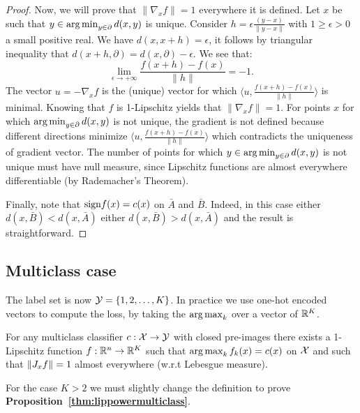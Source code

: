\begin{proof}
        Now, we will prove that $\|\nabla_xf\|=1$ everywhere it is defined. Let $x$ be such that $y\in\operatorname*{arg\,min}_{y\in\partial}{d(x,y)}$ is unique. Consider $h=\epsilon\frac{(y-x)}{\|y-x\|}$ with $1\geq\epsilon>0$ a small positive real. We have $d(x,x+h)=\epsilon$, it follows by triangular inequality that $d(x+h,\partial)=d(x,\partial)-\epsilon$.   
        We see that:
        $$\lim_{\epsilon\to+\infty}\frac{f(x+h)-f(x)}{\|h\|}=-1.$$
        The vector $u=-\nabla_xf$ is the (unique) vector for which $\langle u,\frac{f(x+h)-f(x)}{\|h\|}\rangle$ is minimal. Knowing that $f$ is \mbox{1-Lipschitz} yields that $\|\nabla_xf\|=1$. For points $x$ for which $\operatorname*{arg\,min}_{y\in\partial}{d(x,y)}$ is not unique, the gradient is not defined because different directions minimize $\langle u,\frac{f(x+h)-f(x)}{\|h\|}\rangle$ which contradicts the uniqueness of gradient vector. The number of points for which $y\in\operatorname*{arg\,min}_{y\in\partial}{d(x,y)}$ is not unique must have null measure, since Lipschitz functions are almost everywhere differentiable (by Rademacher’s Theorem).  
          
        Finally, note that $\text{sign}{f(x)}=c(x)$ on $\bar{A}$ and $\bar{B}$. Indeed, in this case either $d(x,\bar{B})<d(x,\bar{A})$ either $d(x,\bar{B})>d(x,\bar{A})$ and the result is straightforward.  
    \end{proof}
    
    \subsection{Multiclass case}\label{app:mutliclassexpressive}

        The label set is now $\mathcal{Y}=\{1,2,\ldots,K\}$. In practice we use one-hot encoded vectors to compute the loss, by taking the $\operatorname*{arg\,max}_k$ over a vector of $\mathbb{R}^K$.  
          
        \begin{proposition}\label{thm:lippowermulticlass}
            For any multiclass classifier $c:\mathcal{X}\rightarrow\mathcal{Y}$ with closed pre-images there exists a 1-Lipschitz function $f:\mathbb{R}^n\rightarrow\mathbb{R}^K$ such that $\operatorname*{arg\,max}_k{f_k(x)}=c(x)$ on $\mathcal{X}$ and such that $\|J_x f\|=1$ almost everywhere (w.r.t Lebesgue measure).  
        \end{proposition}
        
        For the case $K>2$ we must slightly change the definition to prove \textbf{Proposition~\ref{thm:lippowermulticlass}}.  
          
